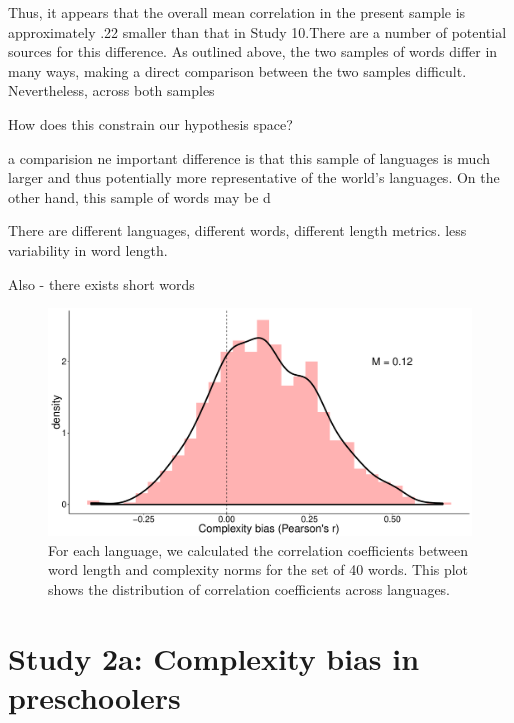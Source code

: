 Thus, it appears that the overall mean correlation in the present sample is approximately .22  smaller than that in Study 10.There are a number of potential sources for this difference. As outlined above, the two samples of words differ in many ways, making a direct comparison between the two samples difficult. Nevertheless, across both samples 


How does this constrain our hypothesis space?


a comparision ne important difference is that this sample of languages is much larger and thus potentially more representative of the world's languages. On the other hand, this sample of words may be d

There are different languages, different words, different length metrics. less variability in word length. 


Also - there exists short words


\begin{figure}[t!]
\begin{center}
\includegraphics[scale = .35]{figs/chap4_1b.pdf}
\end{center}
\caption{For each language, we calculated the correlation coefficients between word length and complexity norms for the set of 40 words. This plot shows the distribution of correlation coefficients across languages. }
\label{fig:study1b}
\end{figure}


\section{Study 2a: Complexity bias in preschoolers }

